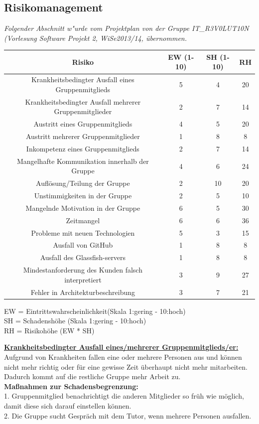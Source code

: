 \documentclass[fontsize=12pt,paper=a4,twoside]{scrartcl}
\begin{document}
\subsection{Risikomanagement}\label{riskmanagement}
\textit{Folgender Abschnitt w"urde vom Projektplan von der Gruppe IT\_R3V0LUT10N (Vorlesung Software Projekt 2, WiSe2013/14, übernommen.}\\
\begin{center}
\begin{tabular}{|c|c|c|c|} \hline 
\textbf{Risiko} & \textbf{EW (1-10)} & \textbf{SH (1-10)} & \textbf{RH}\\ \hline \hline
Krankheitsbedingter Ausfall eines Gruppenmitglieds & 5  & 4 & 20\\ \hline
Krankheitsbedingter Ausfall mehrerer Gruppenmitglieder & 2  & 7 & 14\\ \hline
Austritt eines Gruppenmitglieds & 4 & 5 & 20\\ \hline
Austritt mehrerer Gruppenmitglieder & 1 & 8 & 8\\ \hline
Inkompetenz eines Gruppenmitglieds & 2 & 7 & 14\\ \hline
Mangelhafte Kommunikation innerhalb der Gruppe & 4 & 6 & 24\\ \hline
Auflösung/Teilung der Gruppe & 2 & 10 & 20\\ \hline
Unstimmigkeiten in der Gruppe & 2 & 5 & 10\\ \hline
Mangelnde Motivation in der Gruppe & 6 & 5 & 30\\ \hline
Zeitmangel & 6 & 6 & 36\\ \hline
Probleme mit neuen Technologien & 5 & 3 & 15\\ \hline
Ausfall von GitHub & 1 & 8 & 8\\ \hline
Ausfall des Glassfish-servers & 1 & 8 & 8\\ \hline
Mindestanforderung des Kunden falsch interpretiert & 3 & 9 & 27\\ \hline
Fehler in Architekturbeschreibung & 3 & 7 & 21\\ \hline
\end{tabular}
\end{center}
EW = Eintrittswahrscheinlichkeit(Skala 1:gering - 10:hoch)\\
SH = Schadenshöhe (Skala 1:gering - 10:hoch)\\
RH = Risikohöhe (EW * SH)\\

\bigskip 

\textbf{\underline{Krankheitsbedingter Ausfall eines/mehrerer Gruppenmitglieds/er:}}\\
Aufgrund von Krankheiten fallen eine oder mehrere Personen aus und können nicht mehr richtig oder für eine gewisse Zeit überhaupt nicht mehr mitarbeiten. Dadurch kommt auf die restliche Gruppe mehr Arbeit zu.\\
\textbf{Maßnahmen zur Schadensbegrenzung:}\\
1. Gruppenmitglied benachrichtigt die anderen Mitglieder so früh wie möglich, damit diese sich darauf einstellen können.\\
2. Die Gruppe sucht Gespräch mit dem Tutor, wenn mehrere Personen ausfallen.\\
\end{document}
